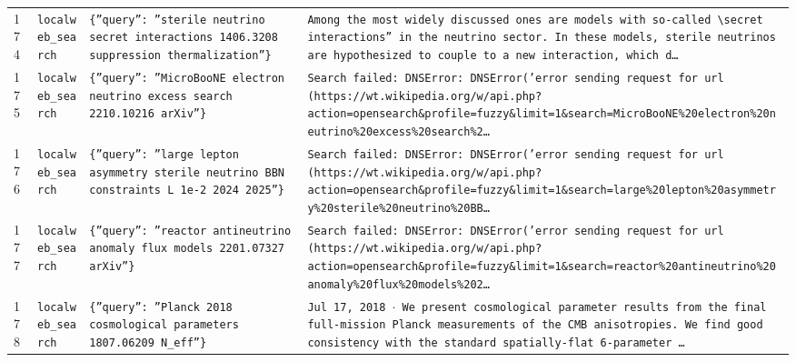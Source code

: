 \documentclass[11pt,a4paper]{article}
\begin{document}
\begin{longtable}{@{}p{}p{}p{}p{}@{}}
174 & \texttt{local}\newline\texttt{web\_\allowbreak{}search} & \texttt{\{''query'':\allowbreak{} ''sterile neutrino secret interactions 1406.3208 suppression thermalization''\}\allowbreak{}} & \texttt{Among the most widely discussed ones are models with so-called \textbackslash{}\allowbreak{}secret interactions'' in the neutrino sector. In these models,\allowbreak{} sterile neutrinos are hypothesized to couple to a new interaction,\allowbreak{} which d\ldots{}\allowbreak{}} \\
175 & \texttt{local}\newline\texttt{web\_\allowbreak{}search} & \texttt{\{''query'':\allowbreak{} ''MicroBooNE electron neutrino excess search 2210.10216 arXiv''\}\allowbreak{}} & \texttt{Search failed:\allowbreak{} DNSError:\allowbreak{} DNSError('error sending request for url (https:\allowbreak{}/\allowbreak{}/\allowbreak{}wt.wikipedia.org/\allowbreak{}w/\allowbreak{}api.php?action=\allowbreak{}opensearch\&profile=\allowbreak{}fuzzy\&limit=\allowbreak{}1\&search=\allowbreak{}MicroBooNE\%20electron\%20neutrino\%20excess\%20search\%2\ldots{}\allowbreak{}} \\
176 & \texttt{local}\newline\texttt{web\_\allowbreak{}search} & \texttt{\{''query'':\allowbreak{} ''large lepton asymmetry sterile neutrino BBN constraints L 1e-2 2024 2025''\}\allowbreak{}} & \texttt{Search failed:\allowbreak{} DNSError:\allowbreak{} DNSError('error sending request for url (https:\allowbreak{}/\allowbreak{}/\allowbreak{}wt.wikipedia.org/\allowbreak{}w/\allowbreak{}api.php?action=\allowbreak{}opensearch\&profile=\allowbreak{}fuzzy\&limit=\allowbreak{}1\&search=\allowbreak{}large\%20lepton\%20asymmetry\%20sterile\%20neutrino\%20BB\ldots{}\allowbreak{}} \\
177 & \texttt{local}\newline\texttt{web\_\allowbreak{}search} & \texttt{\{''query'':\allowbreak{} ''reactor antineutrino anomaly flux models 2201.07327 arXiv''\}\allowbreak{}} & \texttt{Search failed:\allowbreak{} DNSError:\allowbreak{} DNSError('error sending request for url (https:\allowbreak{}/\allowbreak{}/\allowbreak{}wt.wikipedia.org/\allowbreak{}w/\allowbreak{}api.php?action=\allowbreak{}opensearch\&profile=\allowbreak{}fuzzy\&limit=\allowbreak{}1\&search=\allowbreak{}reactor\%20antineutrino\%20anomaly\%20flux\%20models\%202\ldots{}\allowbreak{}} \\
178 & \texttt{local}\newline\texttt{web\_\allowbreak{}search} & \texttt{\{''query'':\allowbreak{} ''Planck 2018 cosmological parameters 1807.06209 N\_\allowbreak{}eff''\}\allowbreak{}} & \texttt{Jul 17,\allowbreak{} 2018 $\cdot$ We present cosmological parameter results from the final full-mission Planck measurements of the CMB anisotropies. We find good consistency with the standard spatially-flat 6-parameter \ldots{}\allowbreak{}} \\

\end{longtable}
\end{document}
